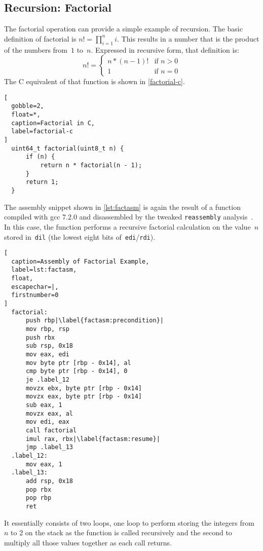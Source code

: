 \subsection{Recursion: Factorial}
The factorial operation can provide a simple example of recursion.
The basic definition of factorial is $n!=\prod_{i=1}^n i$.%
This results in a number that is the product of the numbers from~$1$ to~$n$.
Expressed in recursive form, that definition is:
\begin{equation}
  n!=\begin{cases}
    n * (n - 1)! & \text{if }n > 0 \\
    1 & \text{if }n = 0
  \end{cases}
\end{equation}
The C equivalent of that function is shown in \cref{factorial-c}.
\begin{lstlisting}[
  gobble=2,
  float=*,
  caption=Factorial in C,
  label=factorial-c
]
  uint64_t factorial(uint8_t n) {
      if (n) {
          return n * factorial(n - 1);
      }
      return 1;
  }
\end{lstlisting}
The assembly snippet shown in \cref{lst:factasm} is again
the result of a function compiled with \ac{gcc} 7.2.0
and disassembled by the tweaked \lstinline|reassembly| analysis~\citep{wang2017ramblr}.
In this case, the function performs a recursive factorial calculation on the value~$n$ stored in~\lstinline|dil| (the lowest eight bits of~\lstinline|edi|/\lstinline|rdi|).
\begin{lstlisting}[
  caption=Assembly of Factorial Example,
  label=lst:factasm,
  float,
  escapechar=|,
  firstnumber=0
]
  factorial:
      push rbp|\label{factasm:precondition}|
      mov rbp, rsp
      push rbx
      sub rsp, 0x18
      mov eax, edi
      mov byte ptr [rbp - 0x14], al
      cmp byte ptr [rbp - 0x14], 0
      je .label_12
      movzx ebx, byte ptr [rbp - 0x14]
      movzx eax, byte ptr [rbp - 0x14]
      sub eax, 1
      movzx eax, al
      mov edi, eax
      call factorial
      imul rax, rbx|\label{factasm:resume}|
      jmp .label_13
  .label_12:
      mov eax, 1
  .label_13:
      add rsp, 0x18
      pop rbx
      pop rbp
      ret
\end{lstlisting}
It essentially consists of two loops,
one loop to perform storing the integers from~$n$ to 2 on the stack as the function
is called recursively
and the second to multiply all those values together as each call returns.

